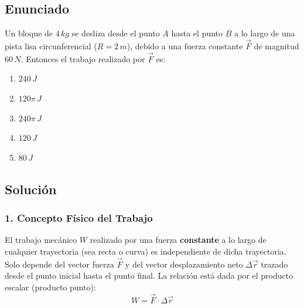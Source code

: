 \documentclass[12pt, a4paper]{article}
\begin{document}
\newpage

\subsection*{Enunciado}
Un bloque de $4 \, \si{kg}$ se desliza desde el punto $A$ hasta el punto $B$ a lo largo de una pista lisa circunferencial ($R = 2 \, \si{m}$), debido a una fuerza constante $\vec{F}$ de magnitud $60 \, \si{N}$. Entonces el trabajo realizado por $\vec{F}$ es:
\begin{enumerate}[label=\alph*)]
    \item $240 \, \si{J}$
    \item $120\pi \, \si{J}$
    \item $240\pi \, \si{J}$
    \item $120 \, \si{J}$
    \item $80 \, \si{J}$
\end{enumerate}

\begin{center}
\end{center}

\subsection*{Solución}

\subsubsection*{1. Concepto Físico del Trabajo}
El trabajo mecánico $W$ realizado por una fuerza \textbf{constante} a lo largo de cualquier trayectoria (sea recta o curva) es independiente de dicha trayectoria. Solo depende del vector fuerza $\vec{F}$ y del vector desplazamiento neto $\Delta\vec{r}$ trazado desde el punto inicial hasta el punto final. La relación está dada por el producto escalar (producto punto):
$$ W = \vec{F} \cdot \Delta\vec{r} $$
\end{document}
